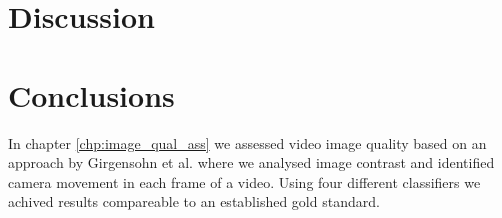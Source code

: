 \chapter{Discussion}
%
%
\chapter{Conclusions}
%
%
%
%
In chapter \ref{chp:image_qual_ass} we assessed video image quality based on an approach by Girgensohn et al.\cite{Girgensohn:2000:SAH:354401.354415} where we analysed image contrast and identified camera movement in each frame of a video. Using four different classifiers we achived results compareable to an established gold standard.
%
